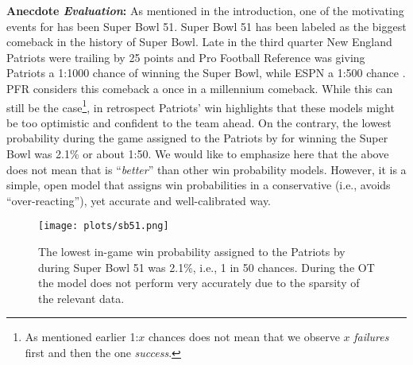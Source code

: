 \iffalse
Qtr1 --> Intercept: 0.01724886 0.08667382 Slope: 0.85147882 0.97192799 Brier: 0.21 (0.25)
Qtr2 --> Intercept: 0.03572466 0.09115063 Slope: 0.84114141 0.93719396 Brier: 0.18 (0.25)
Qtr3 --> Intercept: -0.01549244 0.05285255 Slope: 0.91602858 1.03443241 Brier: 0.14 (0.25)
Qtr4 --> Intercept: -0.1120115 -0.0448949 Slope:  0.9970946  1.2132215 Brier: 0.11 (0.25)
Accuracy --> 0.64 0.71 0.77 0.84
\fi

{\bf Anecdote {\em Evaluation}: }
As mentioned in the introduction, one of the motivating events for {\method} has been Super Bowl 51. 
Super Bowl 51 has been labeled as the biggest comeback in the history of Super Bowl.  
Late in the third quarter New England Patriots were trailing by 25 points and Pro Football Reference was giving Patriots a 1:1000 chance of winning the Super Bowl, while ESPN a 1:500 chance \cite{statsbylopez}. 
PFR considers this comeback a once in a millennium comeback. 
While this can still be the case\footnote{As mentioned earlier 1:$x$ chances does not mean that we observe $x$ {\em failures} first and then the one {\em success}.}, in retrospect Patriots' win highlights that these models might be too optimistic and confident to the team ahead.  
On the contrary, the lowest probability during the game assigned to the Patriots by {\method} for winning the Super Bowl was 2.1\% or about 1:50.  %
We would like to emphasize here that the above does not mean that {\method} is ``{\em better}'' than other win probability models.  
However, it is a simple, open model that assigns win probabilities in a conservative (i.e., avoids ``over-reacting''), yet accurate and well-calibrated way.  


\begin{figure}[t]
\begin{center}
\texttt{[image: plots/sb51.png]}%
 \caption{The lowest in-game win probability assigned to the Patriots by {\method} during Super Bowl 51 was 2.1\%, i.e., 1 in 50 chances. During the OT the model does not perform very accurately due to the sparsity of the relevant data.}
 \label{fig:sb51}
\end{center}
\end{figure}